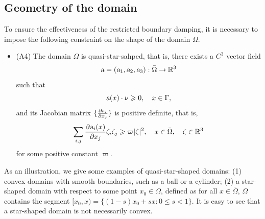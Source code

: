 \documentclass{elsarticle}
\begin{document}
\subsection{Geometry of the domain }

To ensure the effectiveness of the restricted boundary damping, it is necessary to impose the following constraint on the shape of the domain $\Omega$.
\begin{itemize}
\item (A4) The domain $\Omega$ is quasi-star-sahped, that is, there exists a $C^3$ vector field 
\[
	\textsl{a}=(\textsl{a}_1, \textsl{a}_2, \textsl{a}_3): \bar{\Omega}\rightarrow\mathbb{R}^3
\]
such that 
	\begin{equation}\label{qstar_sign}
		\textsl{a}(x)\cdot\nu \geqslant 0, \quad x\in\Gamma,
	\end{equation}
	and its Jacobian matrix $\{\frac{\partial \textsl{a}_{i}}{\partial x_j}\}$ is positive definite, that is,
	\begin{equation}\label{qstar_Jacobi}
		\sum_{i, j}\frac{\partial \textsl{a}_{i}(x)}{\partial x_j}\zeta_i\zeta_j \geqslant \varpi|\zeta|^2,\quad x\in\bar{\Omega}, \quad \zeta\in\mathbb{R}^3
	\end{equation}
	for some positive constant $\varpi$.
\end{itemize}
As an illustration, we give some examples of quasi-star-shaped domains: (1) convex domains with smooth boundaries, such as a ball or a cylinder; (2) a star-shaped domain with respect to some point $x_0\in\Omega$, defined as for all $x\in\bar{\Omega}$, $\Omega$ contains the segment $[x_0, x)=\{(1-s)x_0 + sx: 0\leqslant s <1\}$. It is easy to see that a star-shaped domain is not necessarily convex.
\end{document}
